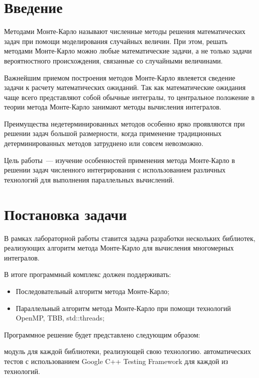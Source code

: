 \documentclass{report}
\begin{document}
\setcounter{page}{2}

\tableofcontents
\newpage

\section*{Введение}
\indent\par Методами Монте-Карло называют численные методы решения математических задач при помощи моделирования случайных величин. При этом, решать методами Монте-Карло можно любые математические задачи, а не только задачи вероятностного происхождения, связанные со случайными величинами.
\par Важнейшим приемом построения методов Монте-Карло явлеяется сведение задачи к расчету математических ожиданий. Так как математические ожидания чаще всего представляют собой обычные интегралы, то центральное положение в теории метода Монте-Карло занимают методы вычисления интегралов.
\par Преимущества недетерминированных методов особенно ярко проявляются при решении задач большой размерности, когда применение традиционных детерминированных методов затруднено или совсем невозможно. 
\par Цель работы~--- изучение особенностей применения метода Монте-Карло в решении задач численного интегрирования с использованием различных технологий для выполнения параллельных вычислений.
\newpage

\section*{Постановка задачи}
\indent\par В рамках лабораторной работы ставится задача разработки нескольких библиотек, реализующих алгоритм метода Монте-Карло для вычисления многомерных интегралов.
\par В итоге программный комплекс должен поддерживать:
\begin{itemize}
\item Последовательный алгоритм метода Монте-Карло;
\item Параллельный алгоритм метода Монте-Карло при помощи технологий OpenMP, TBB, std::threads;
\end{itemize}
\par Программное решение будет представлено следующим образом:
\begin{enumerate} 
 модуль для каждой библиотеки, реализующей свою технологию.
 автоматических тестов с использованием Google C++ Testing Framework для каждой из технологий.
\end{enumerate} 
\end{document}
